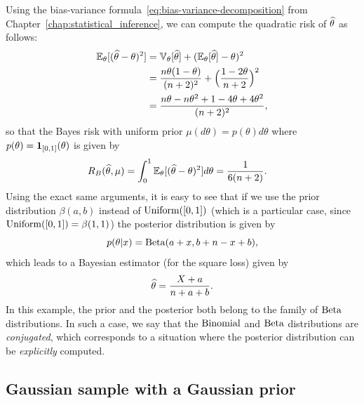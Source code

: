 Using the bias-variance formula~\eqref{eq:bias-variance-decomposition} from Chapter~\ref{chap:statistical_inference}, we can compute the quadratic risk of $\widehat \theta$ as follows:
\begin{align*}
	\mathbb E_\theta[ (\widehat \theta - \theta)^2] &= \mathbb V_\theta[\widehat \theta] + (\mathbb E_\theta[\widehat \theta] - \theta)^2 \\
	&= \frac{n \theta(1 - \theta)}{(n + 2)^2} + \Big(\frac{1 - 2 \theta}{n + 2} \Big)^2 \\
	&= \frac{n \theta - n \theta^2 + 1 - 4 \theta + 4 \theta^2}{(n+2)^2},
\end{align*}
so that the Bayes risk with uniform prior $\mu(d \theta) = p(\theta) d\theta$ where $p(\theta) = \mathbf 1_{[0, 1]}(\theta)$ is given by
\begin{align*}
	R_B(\widehat \theta, \mu) &= \int_0^1 \mathbb E_\theta[ (\widehat \theta - \theta)^2] d \theta 
	= \frac{1}{6(n+2)}.
\end{align*}
Using the exact same arguments, it is easy to see that if we use the prior distribution $\beta(a, b)$ instead of $\operatorname{Uniform}([0, 1])$ (which is a particular case, since $\operatorname{Uniform}([0, 1]) = \beta(1, 1)$) the posterior distribution is given by
\begin{equation*}
	p(\theta | x) = \operatorname{Beta}(a + x, b + n - x + b),
\end{equation*}
which leads to a Bayesian estimator (for the square loss) given by
\begin{equation*}
	\widehat \theta = \frac{X + a}{n + a + b}.
\end{equation*}
In this example, the prior and the posterior both belong to the family of $\operatorname{Beta}$ distributions. 
In such a case, we say that the $\operatorname{Binomial}$ and $\operatorname{Beta}$ distributions are \emph{conjugated}, which corresponds to a situation where the posterior distribution can be \emph{explicitly} computed.

\subsection{Gaussian sample with a Gaussian prior}

